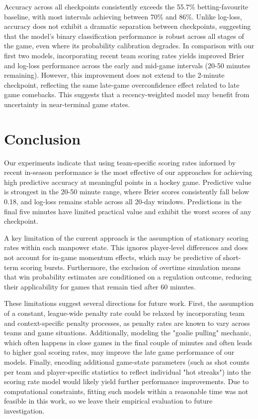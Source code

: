 \documentclass{article}
\begin{document}
Accuracy across all checkpoints consistently exceeds the 55.7\% betting-favourite baseline, with most intervals achieving between 70\% and 86\%. Unlike log-loss, accuracy does not exhibit a dramatic separation between checkpoints, suggesting that the model's binary classification performance is robust across all stages of the game, even where its probability calibration degrades.
In comparison with our first two models, incorporating recent team scoring rates yields improved Brier and log-loss performance across the early and mid-game intervals (20-50 minutes remaining). However, this improvement does not extend to the 2-minute checkpoint, reflecting the same late-game overconfidence effect related to late game comebacks. This suggests that a recency-weighted model may benefit from uncertainty in near-terminal game states.

\section{Conclusion}
Our experiments indicate that using team-specific scoring rates informed by recent in-season performance is the most effective of our approaches for achieving high predictive accuracy at meaningful points in a hockey game. Predictive value is strongest in the 20-50 minute range, where Brier scores consistently fall below 0.18, and log-loss remains stable across all 20-day windows. Predictions in the final five minutes have limited practical value and exhibit the worst scores of any checkpoint.

A key limitation of the current approach is the assumption of stationary scoring rates within each manpower state. This ignores player-level differences and does not account for in-game momentum effects, which may be predictive of short-term scoring bursts. Furthermore, the exclusion of overtime simulation means that win probability estimates are conditioned on a regulation outcome, reducing their applicability for games that remain tied after 60 minutes.

These limitations suggest several directions for future work. First, the assumption of a constant, league-wide penalty rate could be relaxed by incorporating team and context-specific penalty processes, as penalty rates are known to vary across teams and game situations. Additionally, modeling the "goalie pulling" mechanic, which often happens in close games in the final couple of minutes and often leads to higher goal scoring rates, may improve the late game performance of our models. Finally, encoding additional game-state parameters (such as shot counts per team and player-specific statistics to reflect individual "hot streaks") into the scoring rate model would likely yield further performance improvements. Due to computational constraints, fitting such models within a reasonable time was not feasible in this work, so we leave their empirical evaluation to future investigation. 
\end{document}
